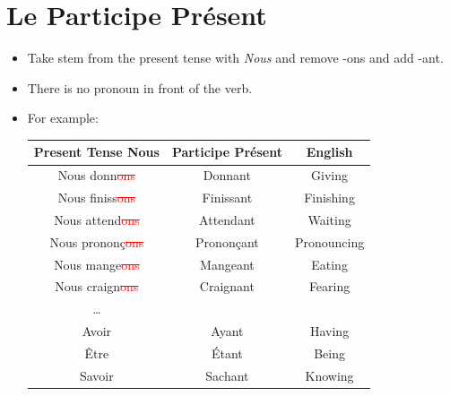\documentclass{book}
\begin{document}
    \section{Le Participe Présent}
        \begin{itemize}
            \item Take stem from the present tense with \textit{Nous} and remove -ons and add -ant.
            \item There is no pronoun in front of the verb.
            \item For example:
                \begin{center}
                    \begin{tabular}{|c|c|c|}
                        \hline
                        \textbf{Present Tense Nous} & \textbf{Participe Présent} & \textbf{English} \\
                        \hline
                        Nous donn\textcolor{red}{\sout{ons}} & Donnant & Giving \\
                        \hline
                        Nous finiss\textcolor{red}{\sout{ons}} & Finissant & Finishing \\
                        \hline
                        Nous attend\textcolor{red}{\sout{ons}} & Attendant & Waiting \\
                        \hline
                        Nous prononç\textcolor{red}{\sout{ons}} & Prononçant & Pronouncing \\
                        \hline
                        Nous mange\textcolor{red}{\sout{ons}} & Mangeant & Eating \\
                        \hline
                        Nous craign\textcolor{red}{\sout{ons}} & Craignant & Fearing \\
                        \hline
                        \dots & & \\
                        \hline
                        Avoir & Ayant & Having \\
                        \hline
                        Être & Étant & Being \\
                        \hline
                        Savoir & Sachant & Knowing \\
                        \hline
                    \end{tabular}
                \end{center}
        \end{itemize}
\end{document}
